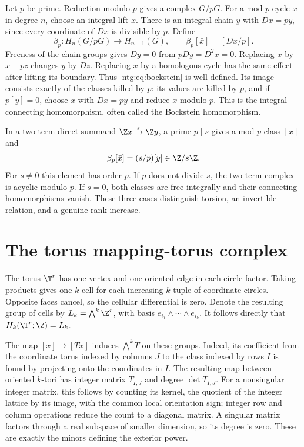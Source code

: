 Let $p$ be prime. Reduction modulo $p$ gives a complex $G/pG$.
For a mod-$p$ cycle $\bar x$ in degree $n$, choose an integral lift
$x$. There is an integral chain $y$ with $Dx=py$, since every
coordinate of $Dx$ is divisible by $p$. Define
\begin{equation}\label{ntg:eq:bockstein}
 \beta_p:H_n(G/pG)\longrightarrow H_{n-1}(G),\qquad
 \beta_p[\bar x]=[Dx/p].
\end{equation}
Freeness of the chain groups gives $Dy=0$ from $pDy=D^2x=0$.
Replacing $x$ by $x+pz$ changes $y$ by $Dz$. Replacing $\bar x$
by a homologous cycle has the same effect after lifting its boundary.
Thus \eqref{ntg:eq:bockstein} is well-defined. Its image consists exactly
of the classes killed by $p$: its values are killed by $p$, and if
$p[y]=0$, choose $x$ with $Dx=py$ and reduce $x$ modulo $p$.
This is the integral connecting homomorphism, often called the
Bockstein homomorphism.

In a two-term direct summand $\Z x\xrightarrow{s}\Z y$, a prime
$p\mid s$ gives a mod-$p$ class $[\bar x]$ and
\begin{equation}\label{ntg:eq:beta-factor}
 \beta_p[\bar x]=(s/p)[y]\in\Z/s\Z.
\end{equation}
For $s\ne0$ this element has order $p$. If $p$ does not divide $s$,
the two-term complex is acyclic modulo $p$. If $s=0$, both classes
are free integrally and their connecting homomorphisms vanish. These
three cases distinguish torsion, an invertible relation, and a genuine
rank increase.

\section{The torus mapping-torus complex}\label{ntg:sec:torus}

The torus $\T^r$ has one vertex and one oriented edge in each circle
factor. Taking products gives one $k$-cell for each increasing
$k$-tuple of coordinate circles. Opposite faces cancel, so the
cellular differential is zero. Denote the resulting group of cells by
$L_k=\bigwedge^k\Z^r$, with basis
$e_{i_1}\wedge\cdots\wedge e_{i_k}$. It follows directly that
$H_k(\T^r;\Z)=L_k$.

The map $[x]\mapsto[Tx]$ induces $\bigwedge^kT$ on these groups.
Indeed, its coefficient from the coordinate torus indexed by columns
$J$ to the class indexed by rows $I$ is found by projecting onto the
coordinates in $I$. The resulting map between oriented $k$-tori has
integer matrix $T_{I,J}$ and degree $\det T_{I,J}$. For a nonsingular
integer matrix, this follows by counting its kernel, the quotient of
the integer lattice by its image, with the common local orientation
sign; integer row and column operations reduce the count to a
diagonal matrix. A singular matrix factors through a real subspace of
smaller dimension, so its degree is zero. These are exactly the
minors defining the exterior power.

